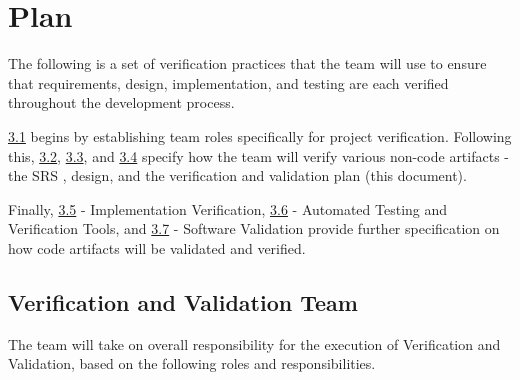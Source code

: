 \documentclass[12pt, titlepage]{article}
\begin{document}
\section{Plan}

The following is a set of verification practices that the \progname{} team will use to ensure that
requirements, design, implementation, and testing are each verified throughout the development process.

\hyperref[sec:VnVTeam]{3.1} begins by establishing team roles specifically for project verification. Following this,
\hyperref[sec:SRSVer]{3.2}, \hyperref[sec:DesignVer]{3.3}, and \hyperref[sec:VnVVer]{3.4} specify how the team will verify
various non-code artifacts - the SRS \citep{SRS}, design, and the verification and validation plan (this document).

Finally, \hyperref[sec:ImpVer]{3.5} - Implementation Verification, \hyperref[sec:AutoTestVer]{3.6} - Automated Testing and
Verification Tools, and \hyperref[sec:SoftVal]{3.7} - Software Validation provide further specification on how code artifacts
will be validated and verified.

\subsection{Verification and Validation Team}
\label{sec:VnVTeam}

The team will take on overall responsibility for the execution of Verification and Validation, based on the following
roles and responsibilities.
\end{document}
